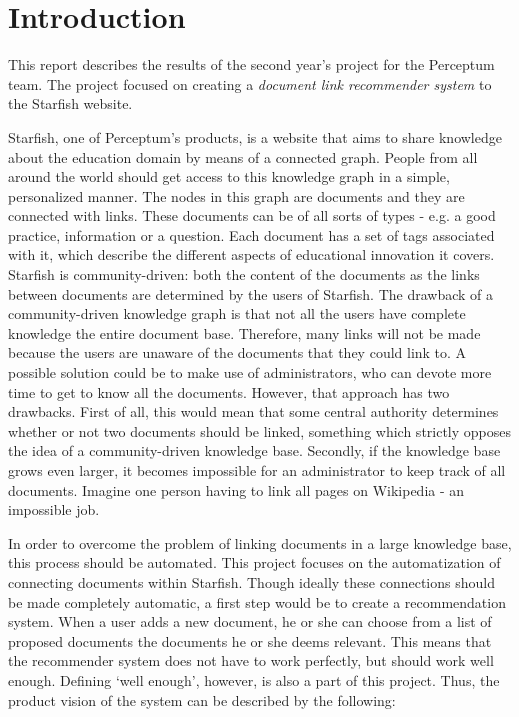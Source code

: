 

\section{Introduction}

This report describes the results of the second year's project for the Perceptum team. The project focused on creating a \emph{document link recommender system} to the Starfish website. 

Starfish, one of Perceptum's products, is a website that aims to share knowledge about the education domain by means of a connected graph. People from all around the world should get access to this knowledge graph in a simple, personalized manner. The nodes in this graph are documents and they are connected with links. These documents can be of all sorts of types - e.g. a good practice, information or a question. Each document has a set of tags associated with it, which describe the different aspects of educational innovation it covers. Starfish is community-driven: both the content of the documents as the links between documents are determined by the users of Starfish. The drawback of a community-driven knowledge graph is that not all the users have complete knowledge the entire document base. Therefore, many links will not be made because the users are unaware of the documents that they could link to. A possible solution could be to make use of administrators, who can devote more time to get to know all the documents. However, that approach has two drawbacks. First of all, this would mean that some central authority determines whether or not two documents should be linked, something which strictly opposes the idea of a community-driven knowledge base. Secondly, if the knowledge base grows even larger, it becomes impossible for an administrator to keep track of all documents. Imagine one person having to link all pages on Wikipedia - an impossible job. 

In order to overcome the problem of linking documents in a large knowledge base, this process should be automated. This project focuses on the automatization of connecting documents within Starfish. Though ideally these connections should be made completely automatic, a first step would be to create a recommendation system. When a user adds a new document, he or she can choose from a list of proposed documents the documents he or she deems relevant. This means that the recommender system does not have to work perfectly, but should work well enough. Defining `well enough', however, is also a part of this project. Thus, the product vision of the system can be described by the following:

